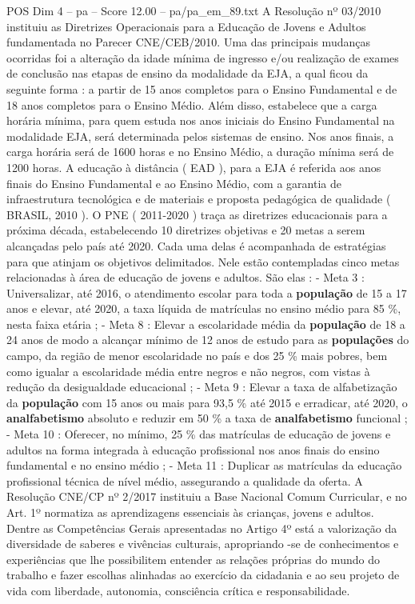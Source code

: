 \begin{textsample}{POS Dim 4 – pa – Score 12.00 – pa/pa\_em\_89.txt}
A Resolução nº 03/2010 instituiu as Diretrizes Operacionais para a Educação de Jovens e Adultos fundamentada no Parecer CNE/CEB/2010.
Uma das principais mudanças ocorridas foi a alteração da idade mínima de ingresso e/ou realização de exames de conclusão nas etapas de ensino da modalidade da EJA, a qual ficou da seguinte forma : a partir de 15 anos completos para o Ensino Fundamental e de 18 anos completos para o Ensino Médio.
Além disso, estabelece que a carga horária mínima, para quem estuda nos anos iniciais do Ensino Fundamental na modalidade EJA, será determinada pelos sistemas de ensino.
Nos anos finais, a carga horária será de 1600 horas e no Ensino Médio, a duração mínima será de 1200 horas.
A educação à distância ( EAD ), para a EJA é referida aos anos finais do Ensino Fundamental e ao Ensino Médio, com a garantia de infraestrutura tecnológica e de materiais e proposta pedagógica de qualidade ( BRASIL, 2010 ).
O PNE ( 2011-2020 ) traça as diretrizes educacionais para a próxima década, estabelecendo 10 diretrizes objetivas e 20 metas a serem alcançadas pelo país até 2020.
Cada uma delas é acompanhada de estratégias para que atinjam os objetivos delimitados.
Nele estão contempladas cinco metas relacionadas à área de educação de jovens e adultos.
São elas : - Meta 3 : Universalizar, até 2016, o atendimento escolar para toda a \textbf{população} de 15 a 17 anos e elevar, até 2020, a taxa líquida de matrículas no ensino médio para 85 \%, nesta faixa etária ; - Meta 8 : Elevar a escolaridade média da \textbf{população} de 18 a 24 anos de modo a alcançar mínimo de 12 anos de estudo para as \textbf{populações} do campo, da região de menor escolaridade no país e dos 25 \% mais pobres, bem como igualar a escolaridade média entre negros e não negros, com vistas à redução da desigualdade educacional ; - Meta 9 : Elevar a taxa de alfabetização da \textbf{população} com 15 anos ou mais para 93,5 \% até 2015 e erradicar, até 2020, o \textbf{analfabetismo} absoluto e reduzir em 50 \% a taxa de \textbf{analfabetismo} funcional ; - Meta 10 : Oferecer, no mínimo, 25 \% das matrículas de educação de jovens e adultos na forma integrada à educação profissional nos anos finais do ensino fundamental e no ensino médio ; - Meta 11 : Duplicar as matrículas da educação profissional técnica de nível médio, assegurando a qualidade da oferta.
A Resolução CNE/CP nº 2/2017 instituiu a Base Nacional Comum Curricular, e no Art. 1º normatiza as aprendizagens essenciais às crianças, jovens e adultos.
Dentre as Competências Gerais apresentadas no Artigo 4º está a valorização da diversidade de saberes e vivências culturais, apropriando -se de conhecimentos e experiências que lhe possibilitem entender as relações próprias do mundo do trabalho e fazer escolhas alinhadas ao exercício da cidadania e ao seu projeto de vida com liberdade, autonomia, consciência crítica e responsabilidade.

\end{textsample}
